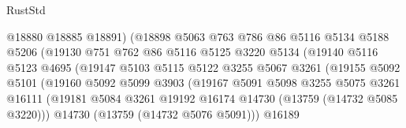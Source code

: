 \begin{lexlean}{RustStd}
\begin{coremodule}
                                  @18880
                                  @18885
                                  @18891)
                                (@18898
                                  @5063
                                  @763
                                  @786
                                  @86
                                  @5116
                                  @5134
                                  @5188
                                  @5206
                                  (@19130
                                    @751
                                    @762
                                    @86
                                    @5116
                                    @5125
                                    @3220
                                    @5134
                                    (@19140
                                      @5116
                                      @5123
                                      @4695
                                      (@19147
                                        @5103
                                        @5115
                                        @5122
                                        @3255
                                        @5067
                                        @3261
                                        (@19155
                                          @5092
                                          @5101
                                          (@19160
                                            @5092
                                            @5099
                                            @3903
                                            (@19167
                                              @5091
                                              @5098
                                              @3255
                                              @5075
                                              @3261
                                              @16111
                                              (@19181
                                                @5084
                                                @3261
                                                @19192
                                                @16174
                                                @14730
                                                (@13759 (@14732 @5085 @3220)))
                                              @14730
                                              (@13759 (@14732 @5076 @5091)))
                                            @16189

\end{coremodule}
\end{lexlean}
